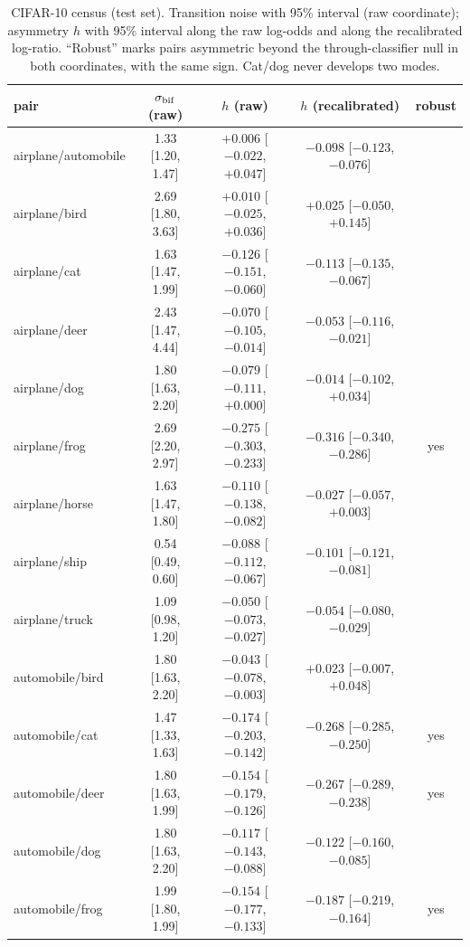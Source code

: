 \begin{table}[h]
\centering
\caption{CIFAR-10 census (test set). Transition noise with 95\% interval (raw coordinate); asymmetry $h$ with 95\% interval along the raw log-odds and along the recalibrated log-ratio. ``Robust'' marks pairs asymmetric beyond the through-classifier null in both coordinates, with the same sign. Cat/dog never develops two modes.}
\label{tab:census_full}
\scriptsize
\begin{tabular}{lcccc}
\toprule
pair & $\sigma_{\rm bif}$ (raw) & $h$ (raw) & $h$ (recalibrated) & robust \\
\midrule
airplane/automobile & 1.33 [1.20, 1.47] & $+0.006$ [$-0.022$, $+0.047$] & $-0.098$ [$-0.123$, $-0.076$] &  \\
airplane/bird & 2.69 [1.80, 3.63] & $+0.010$ [$-0.025$, $+0.036$] & $+0.025$ [$-0.050$, $+0.145$] &  \\
airplane/cat & 1.63 [1.47, 1.99] & $-0.126$ [$-0.151$, $-0.060$] & $-0.113$ [$-0.135$, $-0.067$] &  \\
airplane/deer & 2.43 [1.47, 4.44] & $-0.070$ [$-0.105$, $-0.014$] & $-0.053$ [$-0.116$, $-0.021$] &  \\
airplane/dog & 1.80 [1.63, 2.20] & $-0.079$ [$-0.111$, $+0.000$] & $-0.014$ [$-0.102$, $+0.034$] &  \\
airplane/frog & 2.69 [2.20, 2.97] & $-0.275$ [$-0.303$, $-0.233$] & $-0.316$ [$-0.340$, $-0.286$] & yes \\
airplane/horse & 1.63 [1.47, 1.80] & $-0.110$ [$-0.138$, $-0.082$] & $-0.027$ [$-0.057$, $+0.003$] &  \\
airplane/ship & 0.54 [0.49, 0.60] & $-0.088$ [$-0.112$, $-0.067$] & $-0.101$ [$-0.121$, $-0.081$] &  \\
airplane/truck & 1.09 [0.98, 1.20] & $-0.050$ [$-0.073$, $-0.027$] & $-0.054$ [$-0.080$, $-0.029$] &  \\
automobile/bird & 1.80 [1.63, 2.20] & $-0.043$ [$-0.078$, $-0.003$] & $+0.023$ [$-0.007$, $+0.048$] &  \\
automobile/cat & 1.47 [1.33, 1.63] & $-0.174$ [$-0.203$, $-0.142$] & $-0.268$ [$-0.285$, $-0.250$] & yes \\
automobile/deer & 1.80 [1.63, 1.99] & $-0.154$ [$-0.179$, $-0.126$] & $-0.267$ [$-0.289$, $-0.238$] & yes \\
automobile/dog & 1.80 [1.63, 2.20] & $-0.117$ [$-0.143$, $-0.088$] & $-0.122$ [$-0.160$, $-0.085$] &  \\
automobile/frog & 1.99 [1.80, 1.99] & $-0.154$ [$-0.177$, $-0.133$] & $-0.187$ [$-0.219$, $-0.164$] & yes \\

\end{tabular}
\end{table}
